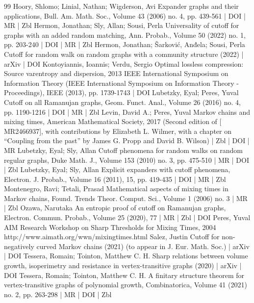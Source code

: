 \begin{thebibliography}{99}
 Hoory, Shlomo; Linial, Nathan; Wigderson, Avi Expander graphs and their applications, Bull. Am. Math. Soc., Volume 43 (2006) no. 4, pp. 439-561 | DOI | MR | Zbl
 Hermon, Jonathan; Sly, Allan; Sousi, Perla Universality of cutoff for graphs with an added random matching, Ann. Probab., Volume 50 (2022) no. 1, pp. 203-240 | DOI | MR | Zbl
 Hermon, Jonathan; Šarković, Anđela; Sousi, Perla Cutoff for random walk on random graphs with a community structure (2022) | arXiv | DOI
 Kontoyiannis, Ioannis; Verdu, Sergio Optimal lossless compression: Source varentropy and dispersion, 2013 IEEE International Symposium on Information Theory (IEEE International Symposium on Information Theory - Proceedings), IEEE (2013), pp. 1739-1743 | DOI
 Lubetzky, Eyal; Peres, Yuval Cutoff on all Ramanujan graphs, Geom. Funct. Anal., Volume 26 (2016) no. 4, pp. 1190-1216 | DOI | MR | Zbl
 Levin, David A.; Peres, Yuval Markov chains and mixing times, American Mathematical Society, 2017 (Second edition of [ MR2466937], with contributions by Elizabeth L. Wilmer, with a chapter on “Coupling from the past” by James G. Propp and David B. Wilson) | Zbl | DOI | MR
 Lubetzky, Eyal; Sly, Allan Cutoff phenomena for random walks on random regular graphs, Duke Math. J., Volume 153 (2010) no. 3, pp. 475-510 | MR | DOI | Zbl
 Lubetzky, Eyal; Sly, Allan Explicit expanders with cutoff phenomena, Electron. J. Probab., Volume 16 (2011), 15, pp. 419-435 | DOI | MR | Zbl
 Montenegro, Ravi; Tetali, Prasad Mathematical aspects of mixing times in Markov chains, Found. Trends Theor. Comput. Sci., Volume 1 (2006) no. 3 | MR | Zbl
 Ozawa, Narutaka An entropic proof of cutoff on Ramanujan graphs, Electron. Commun. Probab., Volume 25 (2020), 77 | MR | Zbl | DOI
 Peres, Yuval AIM Research Workshop on Sharp Thresholds for Mixing Times, 2004 http://www.aimath.org/wwn/mixingtimes.html
 Salez, Justin Cutoff for non-negatively curved Markov chains (2021) (to appear in J. Eur. Math. Soc.) | arXiv | DOI
 Tessera, Romain; Tointon, Matthew C. H. Sharp relations between volume growth, isoperimetry and resistance in vertex-transitive graphs (2020) | arXiv | DOI
 Tessera, Romain; Tointon, Matthew C. H. A finitary structure theorem for vertex-transitive graphs of polynomial growth, Combinatorica, Volume 41 (2021) no. 2, pp. 263-298 | MR | DOI | Zbl
\end{thebibliography}
